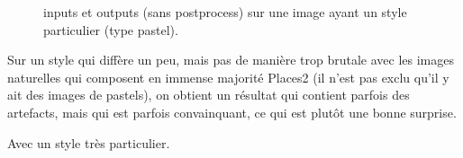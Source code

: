 \documentclass[12pt]{article}
\begin{document}
\begin{figure}[htb]
  \hfill
  \caption{inputs et outputs (sans postprocess) sur une image ayant un style particulier (type pastel).}\label{fig:occlus_dynamic}
\end{figure}

Sur un style qui diffère un peu, mais pas de manière trop brutale avec les images naturelles qui composent en immense majorité Places2 (il n'est pas exclu qu'il y ait des images de pastels), on obtient un résultat qui contient parfois des artefacts, mais qui est parfois convainquant, ce qui est plutôt une bonne surprise.

Avec un style très particulier.

\begin{figure}[htb]
\centering
  \hfill

\end{figure}
\end{document}
